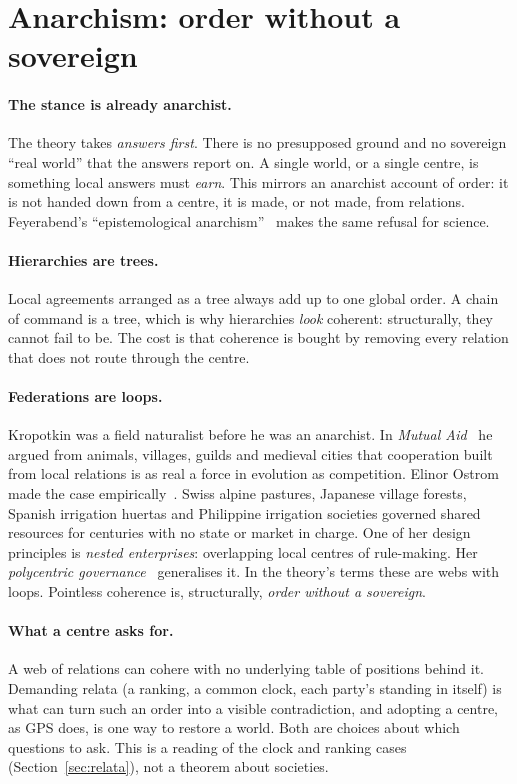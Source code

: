 \documentclass[11pt]{article}
\begin{document}
\section{Anarchism: order without a sovereign}
\paragraph{The stance is already anarchist.} The theory takes \emph{answers
first}. There is no presupposed ground and no sovereign ``real world'' that the
answers report on. A single world, or a single centre, is something local
answers must \emph{earn}. This mirrors an anarchist account of order: it is not
handed down from a centre, it is made, or not made, from relations.
Feyerabend's ``epistemological anarchism''~\cite{feyerabend1975} makes the same
refusal for science.

\paragraph{Hierarchies are trees.} Local agreements arranged as a tree always
add up to one global order. A chain of command is a tree, which is why
hierarchies \emph{look} coherent: structurally, they cannot fail to be. The cost
is that coherence is bought by removing every relation that does not route
through the centre.

\paragraph{Federations are loops.} Kropotkin was a field naturalist before he
was an anarchist. In \emph{Mutual Aid}~\cite{kropotkin1902} he argued from
animals, villages, guilds and medieval cities that cooperation built from local
relations is as real a force in evolution as competition. Elinor Ostrom made
the case empirically~\cite{ostrom1990}. Swiss alpine pastures, Japanese village
forests, Spanish irrigation huertas and Philippine irrigation societies
governed shared resources for centuries with no state or market in charge. One
of her design principles is \emph{nested enterprises}: overlapping local centres
of rule-making. Her \emph{polycentric governance}~\cite{ostrom2010} generalises
it. In the theory's terms these are webs with loops. Pointless coherence is,
structurally, \emph{order without a sovereign}.

\paragraph{What a centre asks for.} A web of relations can cohere with no
underlying table of positions behind it. Demanding relata (a ranking, a common
clock, each party's standing in itself) is what can turn such an order into a
visible contradiction, and adopting a centre, as GPS does, is one way to restore
a world. Both are choices about which questions to ask. This is a reading of the
clock and ranking cases (Section~\ref{sec:relata}), not a theorem about
societies.
\end{document}
